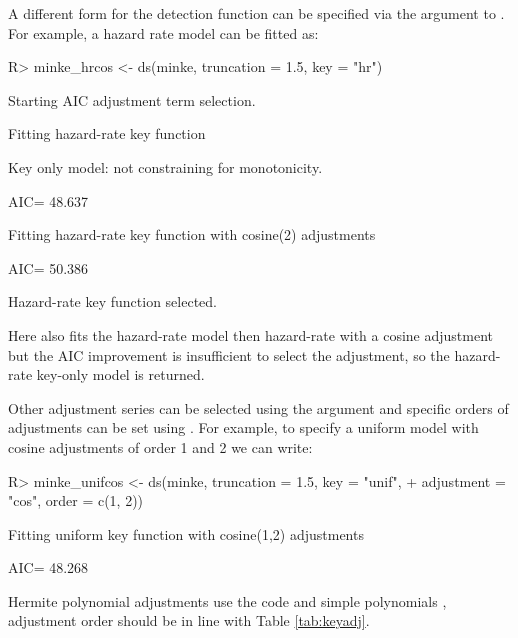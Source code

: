 \documentclass[article]{jss}\usepackage[]{graphicx}\usepackage[]{color}
\begin{document}
A different form for the detection function can be specified via the  argument to . For example, a hazard rate model can be fitted as:
\begin{Schunk}
\begin{Sinput}
R> minke_hrcos <- ds(minke, truncation = 1.5, key = "hr")
\end{Sinput}
\begin{Soutput}
Starting AIC adjustment term selection.
\end{Soutput}
\begin{Soutput}
Fitting hazard-rate key function
\end{Soutput}
\begin{Soutput}
Key only model: not constraining for monotonicity.
\end{Soutput}
\begin{Soutput}
AIC= 48.637
\end{Soutput}
\begin{Soutput}
Fitting hazard-rate key function with cosine(2) adjustments
\end{Soutput}
\begin{Soutput}
AIC= 50.386
\end{Soutput}
\begin{Soutput}

Hazard-rate key function selected.
\end{Soutput}
\end{Schunk}
Here  also fits the hazard-rate model then hazard-rate with a cosine adjustment but the AIC improvement is insufficient to select the adjustment, so the hazard-rate key-only model is returned.

Other adjustment series can be selected using the  argument and specific orders of adjustments can be set using . For example, to specify a uniform model with cosine adjustments of order 1 and 2 we can write:
\begin{Schunk}
\begin{Sinput}
R> minke_unifcos <- ds(minke, truncation = 1.5, key = "unif",
+                     adjustment = "cos", order = c(1, 2))
\end{Sinput}
\begin{Soutput}
Fitting uniform key function with cosine(1,2) adjustments
\end{Soutput}
\begin{Soutput}
AIC= 48.268
\end{Soutput}
\end{Schunk}
Hermite polynomial adjustments use the code  and simple polynomials , adjustment order should be in line with Table \ref{tab:keyadj}.
\end{document}
